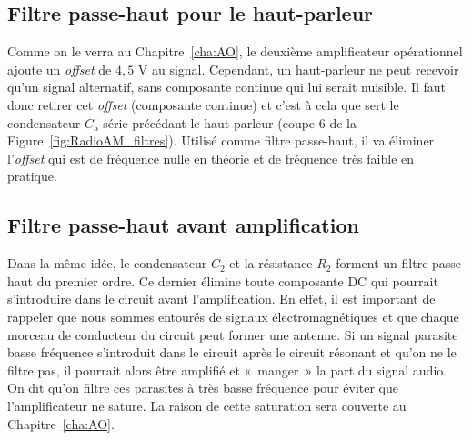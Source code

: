 \subsection{Filtre passe-haut pour le haut-parleur}
Comme on le verra au Chapitre~\ref{cha:AO}, le deuxième amplificateur 
opérationnel ajoute un \textit{offset} de $4{,}5\text{ V}$ au signal. 
Cependant, un haut-parleur ne peut recevoir qu'un signal 
alternatif, sans composante continue qui lui serait nuisible. 
Il faut donc retirer cet \textit{offset} (composante continue) 
et c'est à cela que sert le condensateur $C_5$ série précédant le 
haut-parleur (coupe 6 de la Figure~\ref{fig:RadioAM_filtres}). 
Utilisé comme filtre passe-haut, il va éliminer l'\textit{offset} qui est de 
fréquence nulle en théorie et de fréquence très faible en pratique.

\subsection{Filtre passe-haut avant amplification}
Dans la même idée, le condensateur $C_2$ et la résistance $R_2$ forment un 
filtre passe-haut du premier ordre. Ce dernier élimine toute composante DC qui 
pourrait s'introduire dans le circuit avant l'amplification. En effet, il est 
important de rappeler que nous sommes entourés de signaux électromagnétiques et 
que chaque morceau de conducteur du circuit peut former une antenne. 
Si un signal parasite basse fréquence s'introduit dans le circuit après le circuit 
résonant et qu'on ne le filtre pas, il pourrait alors être amplifié et «~manger~»
la part du signal audio. 
On dit qu'on filtre ces parasites à très basse 
fréquence pour éviter que l'amplificateur ne sature. La raison
de cette saturation sera couverte au Chapitre~\ref{cha:AO}.  
